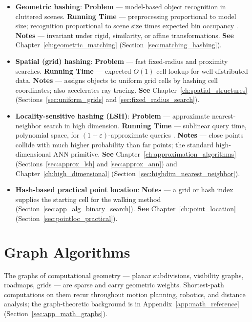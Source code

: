 \begin{itemize}
  \item \textbf{Geometric hashing}:
    \textbf{Problem} --- model-based object recognition in cluttered
    scenes. \textbf{Running Time} --- preprocessing proportional to model
    size; recognition proportional to scene size times expected bin
    occupancy \cite{wolfson1997}. \textbf{Notes} --- invariant under
    rigid, similarity, or affine transformations. \textbf{See}
    Chapter~\ref{ch:geometric_matching} (Section~\ref{sec:matching_hashing}).
  \item \textbf{Spatial (grid) hashing}:
    \textbf{Problem} --- fast fixed-radius and proximity searches.
    \textbf{Running Time} --- expected $O(1)$ cell lookup for
    well-distributed data. \textbf{Notes} --- assigns objects to uniform
    grid cells by hashing cell coordinates; also accelerates ray tracing.
    \textbf{See} Chapter~\ref{ch:spatial_structures}
    (Sections~\ref{sec:uniform_grids} and \ref{sec:fixed_radius_search}).
  \item \textbf{Locality-sensitive hashing (LSH)}:
    \textbf{Problem} --- approximate nearest-neighbor search in high
    dimension. \textbf{Running Time} --- sublinear query time, polynomial
    space, for $(1+\varepsilon)$-approximate queries \cite{indyk1998}.
    \textbf{Notes} --- close points collide with much higher probability
    than far points; the standard high-dimensional ANN primitive.
    \textbf{See} Chapter~\ref{ch:approximation_algorithms}
    (Sections~\ref{sec:approx_lsh} and \ref{sec:approx_ann}) and
    Chapter~\ref{ch:high_dimensional} (Section~\ref{sec:highdim_nearest_neighbor}).
  \item \textbf{Hash-based practical point location}: \textbf{Notes} --- a
    grid or hash index supplies the starting cell for the walking method
    (Section~\ref{sec:app_alg_binary_search}). \textbf{See}
    Chapter~\ref{ch:point_location} (Section~\ref{sec:pointloc_practical}).
\end{itemize}

\section{Graph Algorithms}
\label{sec:app_alg_graphs}

The graphs of computational geometry --- planar subdivisions, visibility
graphs, roadmaps, grids --- are sparse and carry geometric weights.
Shortest-path computations on them recur throughout motion planning,
robotics, and distance analysis; the graph-theoretic background is in
Appendix~\ref{app:math_reference} (Section~\ref{sec:app_math_graphs}).

